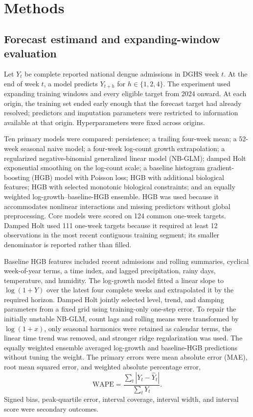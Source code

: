 \documentclass[11pt]{article}
\begin{document}
\section{Methods}

\subsection{Forecast estimand and expanding-window evaluation}

Let $Y_t$ be complete reported national dengue admissions in DGHS week $t$. At the end of week $t$, a model predicts $Y_{t+h}$ for $h\in\{1,2,4\}$. The experiment used expanding training windows and every eligible target from 2024 onward. At each origin, the training set ended early enough that the forecast target had already resolved; predictors and imputation parameters were restricted to information available at that origin. Hyperparameters were fixed across origins.

Ten primary models were compared: persistence; a trailing four-week mean; a 52-week seasonal naive model; a four-week log-count growth extrapolation; a regularized negative-binomial generalized linear model (NB-GLM); damped Holt exponential smoothing on the log-count scale; a baseline histogram gradient-boosting (HGB) model with Poisson loss; HGB with additional biological features; HGB with selected monotonic biological constraints; and an equally weighted log-growth--baseline-HGB ensemble. HGB was used because it accommodates nonlinear interactions and missing predictors without global preprocessing. Core models were scored on 124 common one-week targets. Damped Holt used 111 one-week targets because it required at least 12 observations in the most recent contiguous training segment; its smaller denominator is reported rather than filled.

Baseline HGB features included recent admissions and rolling summaries, cyclical week-of-year terms, a time index, and lagged precipitation, rainy days, temperature, and humidity. The log-growth model fitted a linear slope to $\log(1+Y)$ over the latest four complete weeks and extrapolated it by the required horizon. Damped Holt jointly selected level, trend, and damping parameters from a fixed grid using training-only one-step error. To repair the initially unstable NB-GLM, count lags and rolling means were transformed by $\log(1+x)$, only seasonal harmonics were retained as calendar terms, the linear time trend was removed, and stronger ridge regularization was used. The equally weighted ensemble averaged log-growth and baseline-HGB predictions without tuning the weight. The primary errors were mean absolute error (MAE), root mean squared error, and weighted absolute percentage error,
\begin{equation}
\mathrm{WAPE}=\frac{\sum_t|Y_t-\widehat{Y}_t|}{\sum_t Y_t}.
\end{equation}
Signed bias, peak-quartile error, interval coverage, interval width, and interval score were secondary outcomes.
\end{document}
